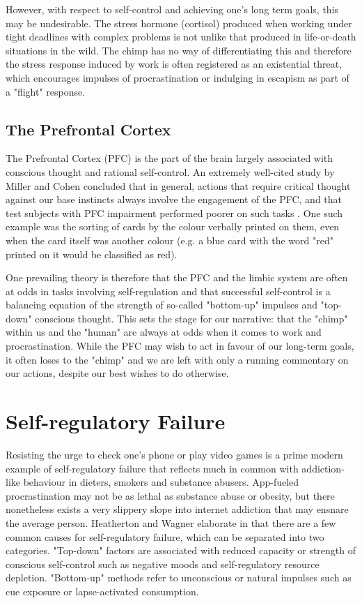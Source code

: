 However, with respect to self-control and achieving one's long term goals, this may be undesirable. The stress hormone (cortisol) produced when working under tight deadlines with complex problems is not unlike that produced in life-or-death situations in the wild. The chimp has no way of differentiating this and therefore the stress response induced by work is often registered as an existential threat, which encourages impulses of procrastination or indulging in escapism as part of a "flight" response.

\subsection{The Prefrontal Cortex}
The Prefrontal Cortex (PFC) is the part of the brain largely associated with conscious thought and rational self-control. An extremely well-cited study by Miller and Cohen concluded that in general, actions that require critical thought against our base instincts always involve the engagement of the PFC, and that test subjects with PFC impairment performed poorer on such tasks \cite{miller2001integrative}. One such example was the sorting of cards by the colour verbally printed on them, even when the card itself was another colour (e.g. a blue card with the word "red" printed on it would be classified as red).

One prevailing theory is therefore that the PFC and the limbic system are often at odds in tasks involving self-regulation \cite{heatherton2011cognitive} and that successful self-control is a balancing equation of the strength of so-called "bottom-up" impulses and "top-down" conscious thought. This sets the stage for our narrative: that the "chimp" within us and the "human" are always at odds when it comes to work and procrastination. While the PFC may wish to act in favour of our long-term goals, it often loses to the "chimp" and we are left with only a running commentary on our actions, despite our best wishes to do otherwise.

\section{Self-regulatory Failure}
Resisting the urge to check one's phone or play video games is a prime modern example of self-regulatory failure that reflects much in common with addiction-like behaviour in dieters, smokers and substance abusers. App-fueled procrastination may not be as lethal as substance abuse or obesity, but there nonetheless exists a very slippery slope into internet addiction that may ensnare the average person. Heatherton and Wagner elaborate in \cite{heatherton2011cognitive} that there are a few common causes for self-regulatory failure, which can be separated into two categories. "Top-down" factors are associated with reduced capacity or strength of conscious self-control such as negative moods and self-regulatory resource depletion. "Bottom-up" methods refer to unconscious or natural impulses such as cue exposure or lapse-activated consumption.

